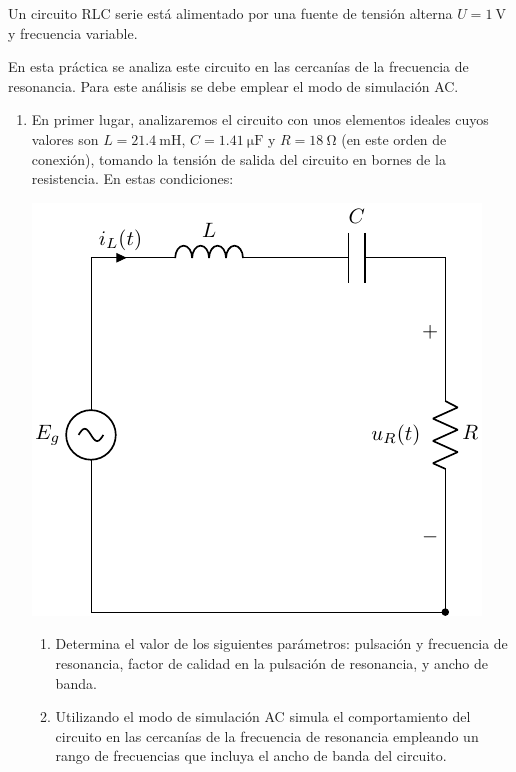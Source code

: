 \documentclass[a4paper,10pt]{article} %
\begin{document}

\vspace{1cm} Un circuito RLC serie está alimentado por una fuente de
tensión alterna $U = \qty{1}{\volt}$ y frecuencia variable.

En esta práctica se analiza este circuito en las cercanías de la
frecuencia de resonancia. Para este análisis se debe emplear el modo
de simulación AC.
	
\begin{enumerate}
\item En primer lugar, analizaremos el circuito con unos elementos
  ideales cuyos valores son $L =\qty{21.4}{\milli\henry}$,
  $C=\qty{1.41}{\micro\farad}$ y $R=\qty{18}{\ohm}$ (en este orden de
  conexión), tomando la tensión de salida del circuito en bornes de la
  resistencia. En estas condiciones:

  \begin{center}
    \includegraphics[height=0.2\textheight]{../figs/circuito_P4}
  \end{center}

  \begin{enumerate}
  \item Determina el valor de los siguientes parámetros: pulsación y
    frecuencia de resonancia, factor de calidad en la pulsación de
    resonancia, y ancho de banda.
  \item Utilizando el modo de simulación \textsc{AC} simula el
    comportamiento del circuito en las cercanías de la frecuencia de
    resonancia empleando un rango de frecuencias que incluya el ancho
    de banda del circuito.
  \end{enumerate}
	

\end{enumerate}
\end{document}
